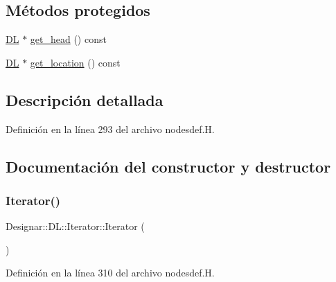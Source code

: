 \subsection*{Métodos protegidos}
\begin{DoxyCompactItemize}
\item 
\hyperlink{class_designar_1_1_d_l}{DL} $\ast$ \hyperlink{class_designar_1_1_d_l_1_1_iterator_a575d5bbd0ce2e3d5df42d5d0112a1063}{get\+\_\+head} () const
\item 
\hyperlink{class_designar_1_1_d_l}{DL} $\ast$ \hyperlink{class_designar_1_1_d_l_1_1_iterator_af9d1225d5fa038ec4868e0910d4b9da0}{get\+\_\+location} () const
\end{DoxyCompactItemize}


\subsection{Descripción detallada}


Definición en la línea 293 del archivo nodesdef.\+H.



\subsection{Documentación del constructor y destructor}
\mbox{\label{class_designar_1_1_d_l_1_1_iterator_ac8115296dde1a00604510beba6707b36}} 
\subsubsection{\texorpdfstring{Iterator()}{Iterator()}\hspace{0.1cm}{\footnotesize\ttfamily [1/5]}}
{\footnotesize\ttfamily Designar\+::\+D\+L\+::\+Iterator\+::\+Iterator (\begin{DoxyParamCaption}{ }\end{DoxyParamCaption})\hspace{0.3cm}{\ttfamily [inline]}}



Definición en la línea 310 del archivo nodesdef.\+H.

\mbox{\label{class_designar_1_1_d_l_1_1_iterator_ab40eab4206926dca72f7981c4920c984}} 

